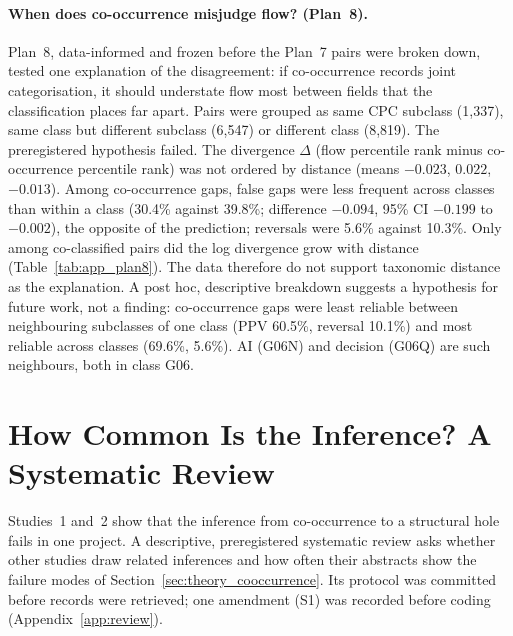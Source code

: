 \paragraph{When does co-occurrence misjudge flow? (Plan~8).} Plan~8, data-informed and frozen before the Plan~7 pairs were broken down, tested one explanation of the disagreement: if co-occurrence records joint categorisation, it should understate flow most between fields that the classification places far apart. Pairs were grouped as same CPC subclass (1,337), same class but different subclass (6,547) or different class (8,819). The preregistered hypothesis failed. The divergence $\Delta$ (flow percentile rank minus co-occurrence percentile rank) was not ordered by distance (means $-0.023$, $0.022$, $-0.013$). Among co-occurrence gaps, false gaps were less frequent across classes than within a class (30.4\% against 39.8\%; difference $-0.094$, 95\% CI $-0.199$ to $-0.002$), the opposite of the prediction; reversals were 5.6\% against 10.3\%. Only among co-classified pairs did the log divergence grow with distance (Table~\ref{tab:app_plan8}). The data therefore do not support taxonomic distance as the explanation. A post hoc, descriptive breakdown suggests a hypothesis for future work, not a finding: co-occurrence gaps were least reliable between neighbouring subclasses of one class (PPV 60.5\%, reversal 10.1\%) and most reliable across classes (69.6\%, 5.6\%). AI (G06N) and decision (G06Q) are such neighbours, both in class G06.

\section{How Common Is the Inference? A Systematic Review}
\label{sec:review}

Studies~1 and~2 show that the inference from co-occurrence to a structural hole fails in one project. A descriptive, preregistered systematic review asks whether other studies draw related inferences and how often their abstracts show the failure modes of Section~\ref{sec:theory_cooccurrence}. Its protocol was committed before records were retrieved; one amendment (S1) was recorded before coding (Appendix~\ref{app:review}).

